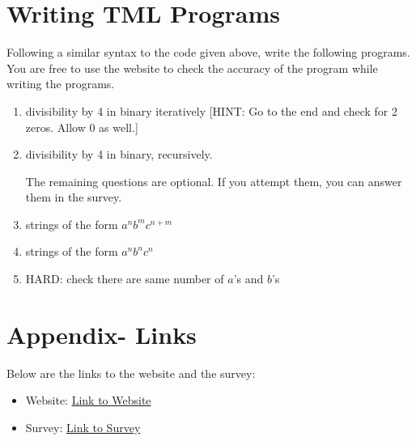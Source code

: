 \section{Writing TML Programs}

Following a similar syntax to the code given above, write the following programs. You are free to use the website to check the accuracy of the program while writing the programs.
\begin{enumerate}
    \item divisibility by 4 in binary iteratively [HINT: Go to the end and check for 2 zeros. Allow 0 as well.]
    \item divisibility by 4 in binary, recursively.
    
    \noindent The remaining questions are optional. If you attempt them, you can answer them in the survey.
    \item strings of the form $a^n b^m c^{n+m}$
    \item strings of the form $a^n b^n c^n$
    \item HARD: check there are same number of $a$'s and $b$'s
\end{enumerate}

\section{Appendix- Links}
Below are the links to the website and the survey:
\begin{itemize}
    \item Website: \href{https://pete-g00.github.io/Turing-Machine-Language/}{Link to Website}
    \item Survey: \href{https://forms.office.com/e/Ts6nKgxWkU}{Link to Survey}
\end{itemize}
